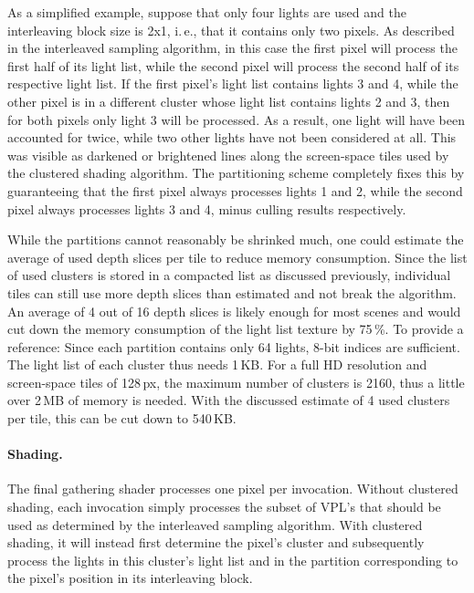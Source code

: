As a simplified example, suppose that only four lights are used and the interleaving block size is 2x1, i.\,e., that it contains only two pixels. As described in the interleaved sampling algorithm, in this case the first pixel will process the first half of its light list, while the second pixel will process the second half of its respective light list. If the first pixel's light list contains lights 3 and 4, while the other pixel is in a different cluster whose light list contains lights 2 and 3, then for both pixels only light 3 will be processed. As a result, one light will have been accounted for twice, while two other lights have not been considered at all. This was visible as darkened or brightened lines along the screen-space tiles used by the clustered shading algorithm. The partitioning scheme completely fixes this by guaranteeing that the first pixel always processes lights 1 and 2, while the second pixel always processes lights 3 and 4, minus culling results respectively.

While the partitions cannot reasonably be shrinked much, one could estimate the average of used depth slices per tile to reduce memory consumption. Since the list of used clusters is stored in a compacted list as discussed previously, individual tiles can still use more depth slices than estimated and not break the algorithm. An average of 4 out of 16 depth slices is likely enough for most scenes and would cut down the memory consumption of the light list texture by 75\,\%. To provide a reference: Since each partition contains only 64 lights, 8-bit indices are sufficient. The light list of each cluster thus needs 1\,KB. For a full HD resolution and screen-space tiles of 128\,px, the maximum number of clusters is 2160, thus a little over 2\,MB of memory is needed. With the discussed estimate of 4 used clusters per tile, this can be cut down to 540\,KB.

\paragraph{Shading.}
The final gathering shader processes one pixel per invocation. Without clustered shading, each invocation simply processes the subset of VPL's that should be used as determined by the interleaved sampling algorithm. With clustered shading, it will instead first determine the pixel's cluster and subsequently process the lights in this cluster's light list and in the partition corresponding to the pixel's position in its interleaving block.


